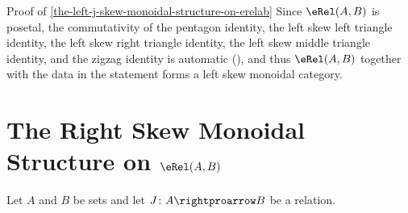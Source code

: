 \begin{Proof}{Proof of \cref{the-left-j-skew-monoidal-structure-on-erelab}}%
    Since $\eRel(A,B)$ is posetal, the commutativity of the pentagon identity, the left skew left triangle identity, the left skew right triangle identity, the left skew middle triangle identity, and the zigzag identity is automatic (), and thus $\eRel(A,B)$ together with the data in the statement forms a left skew monoidal category.
\end{Proof}
\section{The Right Skew Monoidal Structure on $\eRel(A,B)$}\label{section-the-right-skew-monoidal-structure-on-rel-a-b}
Let $A$ and $B$ be sets and let $J\colon A\rightproarrow B$ be a relation.
